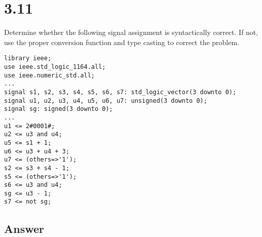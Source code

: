 \documentclass[dvipsnames, svgnames, x11names, a4paper,12pt]{article}
\begin{document}
\section{3.11}    
Determine whether the following signal assignment is syntactically correct. If not,
use the proper conversion function and type casting to correct the problem.
\begin{lstlisting}
library ieee;
use ieee.std_logic_1164.all;
use ieee.numeric_std.all;
...
signal s1, s2, s3, s4, s5, s6, s7: std_logic_vector(3 downto 0);
signal u1, u2, u3, u4, u5, u6, u7: unsigned(3 downto 0);
signal sg: signed(3 downto 0);
...
u1 <= 2#0001#;
u2 <= u3 and u4;
u5 <= s1 + 1;
u6 <= u3 + u4 + 3;
u7 <= (others=>'1');
s2 <= s3 + s4 - 1;
s5 <= (others=>'1');
s6 <= u3 and u4;
sg <= u3 - 1;
s7 <= not sg;

\end{lstlisting}
\subsection{Answer}
\end{document}
